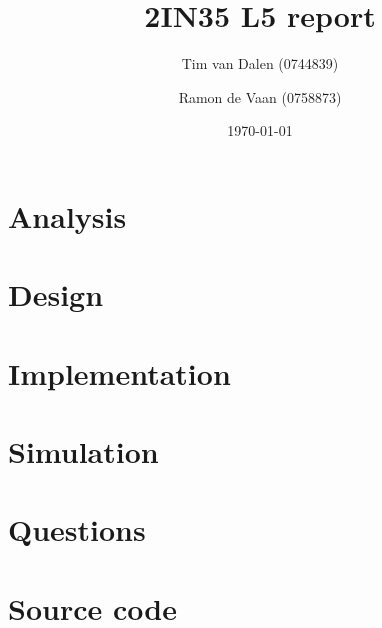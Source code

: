 \documentclass[a4paper,11pt]{article}
\title{
	2IN35 L5 report
}
\author{
	Tim van Dalen (0744839)
	\and
	Ramon de Vaan (0758873)
}
\date{\today}
\begin{document}
	\maketitle

	\section{Analysis}
	

	\section{Design}
	

	\section{Implementation}
	

	\section{Simulation}
	

	\section{Questions}
	

	\appendix
	\section{Source code}
	
\end{document}
